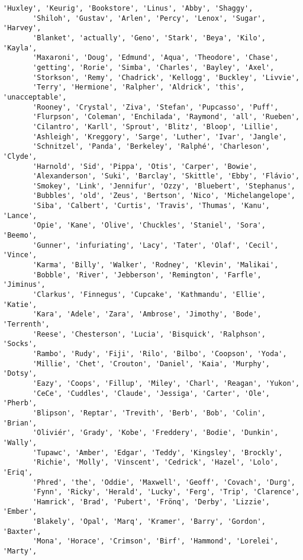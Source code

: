 \documentclass[11pt]{article}
\begin{document}
\begin{tcolorbox}[breakable, size=fbox, boxrule=.5pt, pad at break*=1mm, opacityfill=0]
\begin{Verbatim}[commandchars=\\\{\}]
       'Huxley', 'Keurig', 'Bookstore', 'Linus', 'Abby', 'Shaggy',
       'Shiloh', 'Gustav', 'Arlen', 'Percy', 'Lenox', 'Sugar', 'Harvey',
       'Blanket', 'actually', 'Geno', 'Stark', 'Beya', 'Kilo', 'Kayla',
       'Maxaroni', 'Doug', 'Edmund', 'Aqua', 'Theodore', 'Chase',
       'getting', 'Rorie', 'Simba', 'Charles', 'Bayley', 'Axel',
       'Storkson', 'Remy', 'Chadrick', 'Kellogg', 'Buckley', 'Livvie',
       'Terry', 'Hermione', 'Ralpher', 'Aldrick', 'this', 'unacceptable',
       'Rooney', 'Crystal', 'Ziva', 'Stefan', 'Pupcasso', 'Puff',
       'Flurpson', 'Coleman', 'Enchilada', 'Raymond', 'all', 'Rueben',
       'Cilantro', 'Karll', 'Sprout', 'Blitz', 'Bloop', 'Lillie',
       'Ashleigh', 'Kreggory', 'Sarge', 'Luther', 'Ivar', 'Jangle',
       'Schnitzel', 'Panda', 'Berkeley', 'Ralphé', 'Charleson', 'Clyde',
       'Harnold', 'Sid', 'Pippa', 'Otis', 'Carper', 'Bowie',
       'Alexanderson', 'Suki', 'Barclay', 'Skittle', 'Ebby', 'Flávio',
       'Smokey', 'Link', 'Jennifur', 'Ozzy', 'Bluebert', 'Stephanus',
       'Bubbles', 'old', 'Zeus', 'Bertson', 'Nico', 'Michelangelope',
       'Siba', 'Calbert', 'Curtis', 'Travis', 'Thumas', 'Kanu', 'Lance',
       'Opie', 'Kane', 'Olive', 'Chuckles', 'Staniel', 'Sora', 'Beemo',
       'Gunner', 'infuriating', 'Lacy', 'Tater', 'Olaf', 'Cecil', 'Vince',
       'Karma', 'Billy', 'Walker', 'Rodney', 'Klevin', 'Malikai',
       'Bobble', 'River', 'Jebberson', 'Remington', 'Farfle', 'Jiminus',
       'Clarkus', 'Finnegus', 'Cupcake', 'Kathmandu', 'Ellie', 'Katie',
       'Kara', 'Adele', 'Zara', 'Ambrose', 'Jimothy', 'Bode', 'Terrenth',
       'Reese', 'Chesterson', 'Lucia', 'Bisquick', 'Ralphson', 'Socks',
       'Rambo', 'Rudy', 'Fiji', 'Rilo', 'Bilbo', 'Coopson', 'Yoda',
       'Millie', 'Chet', 'Crouton', 'Daniel', 'Kaia', 'Murphy', 'Dotsy',
       'Eazy', 'Coops', 'Fillup', 'Miley', 'Charl', 'Reagan', 'Yukon',
       'CeCe', 'Cuddles', 'Claude', 'Jessiga', 'Carter', 'Ole', 'Pherb',
       'Blipson', 'Reptar', 'Trevith', 'Berb', 'Bob', 'Colin', 'Brian',
       'Oliviér', 'Grady', 'Kobe', 'Freddery', 'Bodie', 'Dunkin', 'Wally',
       'Tupawc', 'Amber', 'Edgar', 'Teddy', 'Kingsley', 'Brockly',
       'Richie', 'Molly', 'Vinscent', 'Cedrick', 'Hazel', 'Lolo', 'Eriq',
       'Phred', 'the', 'Oddie', 'Maxwell', 'Geoff', 'Covach', 'Durg',
       'Fynn', 'Ricky', 'Herald', 'Lucky', 'Ferg', 'Trip', 'Clarence',
       'Hamrick', 'Brad', 'Pubert', 'Frönq', 'Derby', 'Lizzie', 'Ember',
       'Blakely', 'Opal', 'Marq', 'Kramer', 'Barry', 'Gordon', 'Baxter',
       'Mona', 'Horace', 'Crimson', 'Birf', 'Hammond', 'Lorelei', 'Marty',

\end{Verbatim}
\end{tcolorbox}
\end{document}
